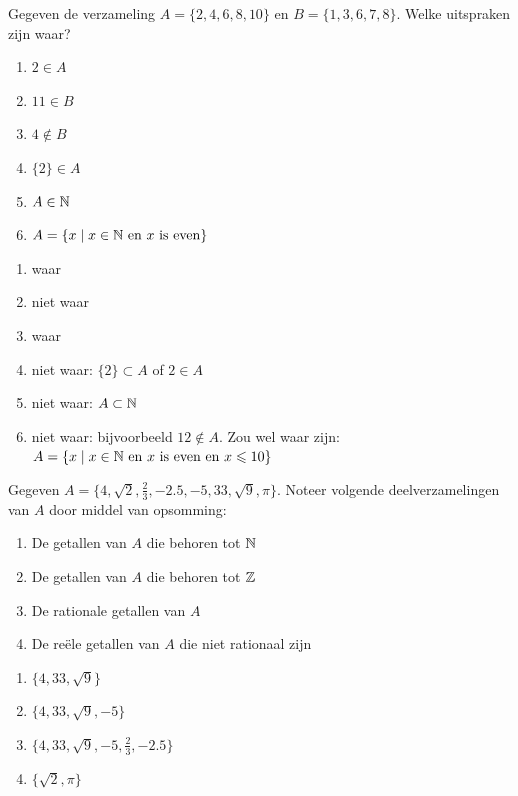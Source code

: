 \begin{oef}
Gegeven de verzameling $A=\{2,4,6,8,10\}$ en $B=\{1,3,6,7,8\}$. Welke uitspraken zijn waar? 
\begin{enumerate}
\item $2\in A$
\item $11\in B$
\item $4 \not \in B$
\item $\{2\}\in A$
\item $A\in \mathbb{N}$
\item $A=\{x\mid x\in \mathbb{N} \mathrm{~en~}x\mathrm{~is~even}\}$
\end{enumerate}
\begin{opl}
\begin{enumerate}
\item waar
\item niet waar
\item waar
\item niet waar: $\{2\}\subset A$ of $2\in A$
\item niet waar: $A\subset \mathbb{N}$
\item niet waar: bijvoorbeeld $12\not \in A$. Zou wel waar zijn: $A=\{x\mid x\in \mathbb{N} \mathrm{~en~}x\text{~is~even en }x\leqslant 10\}$
\end{enumerate}
\end{opl}
\end{oef}




\begin{oef}
Gegeven $A=\{4,\sqrt{2}, \frac{2}{3}, -2.5, -5,33,\sqrt{9},\pi \}$. Noteer volgende deelverzamelingen van $A$ door middel van opsomming:
\begin{enumerate}
\item De  getallen van $A$ die behoren tot $\mathbb{N}$
\item De  getallen van $A$ die behoren tot $\mathbb{Z}$
\item De rationale getallen van $A$
\item De re\"ele getallen van $A$ die niet rationaal zijn
\end{enumerate}
\begin{opl}
\begin{enumerate}
\item $\{ 4,33,\sqrt{9}\}$
\item $\{ 4,33,\sqrt{9},-5\}$
\item $\{ 4,33,\sqrt{9},-5,\frac 23,-2.5\}$
\item $\{\sqrt{2},\pi\}$
\end{enumerate}
\end{opl}
\end{oef}




